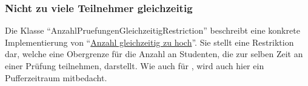 \subsubsection{Nicht zu viele Teilnehmer gleichzeitig}\label{subsubsec:nicht-zu-viele-teilnehmer-gleichzeitig}
Die Klasse \enquote{AnzahlPruefungenGleichzeitigRestriction} beschreibt eine konkrete Implementierung von
\enquote{\hyperref[subsubsec:anzahl-gleichzeitig-zu-hoch]{Anzahl gleichzeitig zu hoch}}.
Sie stellt eine Restriktion dar, welche eine Obergrenze für die Anzahl an Studenten,
die zur selben Zeit an einer Prüfung teilnehmen, darstellt.
Wie auch für , wird auch hier ein Pufferzeitraum mitbedacht.

